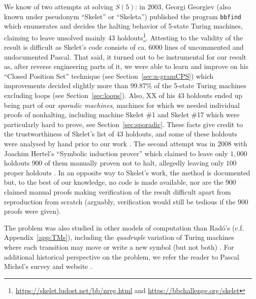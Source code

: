 \documentclass[a4paper,british]{article}
\theoremstyle{definition} %
\numberwithin{equation}{section}
\theoremstyle{definition} %
\newcommand{\ts}[1]{{\color{red}#1}}
\newcommand{\rado}{Rad\'o\xspace}
\begin{document}
\newcommand{\SkeletHoldoutsSporadic}{\ts{XX}\xspace}

We know of two attempts at solving $S(5)$: in 2003, Georgi Georgiev (also known under pseudonym ``Skelet'' or ``Skeleta'') published the program \texttt{bbfind} \cite{Skelet_bbfind} which enumerates and decides the halting behavior of 5-state Turing machines, claiming to leave unsolved mainly 43 holdouts\footnote{\url{https://skelet.ludost.net/bb/nreg.html} and \url{https://bbchallenge.org/skelet}}. Attesting to the validity of the result is difficult as Skelet's code consists of ca. 6000 lines of uncommented and undocumented Pascal. That said, it turned out to be instrumental for our result as, after reverse engineering parts of it, we were able to learn and improve on his ``Closed Position Set'' technique (see Section~\ref{sec:n-gramCPS}) which improvements decided slightly more than 99.87\% of the 5-state Turing machines excluding loops (see Section~\ref{sec:loops}). Also, \SkeletHoldoutsSporadic of his 43 holdouts ended up being part of our \textit{sporadic machines}, \ie machines for which we needed individual proofs of nonhalting, including machine Skelet \#1 and Skelet \#17 which were particularly hard to prove, see Section~\ref{sec:sporadic}. These facts give credit to the trustworthiness of Skelet's list of 43 holdouts, and some of these holdouts were analysed by hand prior to our work \cite{DanBriggs}. The second attempt was in 2008 with Joachim Hertel's ``Symbolic induction prover'' which claimed to leave only $1{,}000$ holdouts $900$ of them manually proven not to halt, allegedly leaving only $100$ proper holdouts \cite{Hertel}. In an opposite way to Skelet's work, the method is documented but, to the best of our knowledge, no code is made available, nor are the 900 claimed manual proofs making verification of the result difficult apart from reproduction from scratch (arguably, verification would still be tedious if the 900 proofs were given).

The \BBfull problem was also studied in other models of computation than \rado's (c.f. Appendix~\ref{app:TMs}), including the \textit{quadruple} variation of Turing machines where each transition may move or write a new symbol (but not both) \cite{Ross2003,Ross2005}. For additional historical perspective on the \BBfull problem, we refer the reader to Pascal Michel's survey and website \cite{michel2019busy,PMichel_website}.


\end{document}
